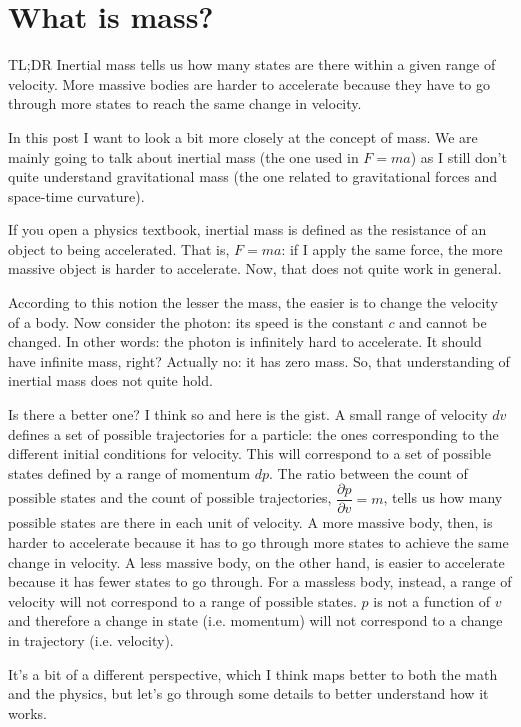 \documentclass[aps,pra,10pt,floatfix,nofootinbib]{revtex4-1}
\theoremstyle{definition}
\begin{document}
	
\section{What is mass?}

TL;DR Inertial mass tells us how many states are there within a given range of velocity. More massive bodies are harder to accelerate because they have to go through more states to reach the same change in velocity.

In this post I want to look a bit more closely at the concept of mass. We are mainly going to talk about inertial mass (the one used in $F=ma$) as I still don't quite understand gravitational mass (the one related to gravitational forces and space-time curvature).

If you open a physics textbook, inertial mass is defined as the resistance of an object to being accelerated. That is, $F=ma$: if I apply the same force, the more massive object is harder to accelerate. Now, that does not quite work in general.

According to this notion the lesser the mass, the easier is to change the velocity of a body. Now consider the photon: its speed is the constant $c$ and cannot be changed. In other words: the photon is infinitely hard to accelerate. It should have infinite mass, right? Actually no: it has zero mass. So, that understanding of inertial mass does not quite hold.

Is there a better one? I think so and here is the gist. A small range of velocity $dv$ defines a set of possible trajectories for a particle: the ones corresponding to the different initial conditions for velocity. This will correspond to a set of possible states defined by a range of momentum $dp$. The ratio between the count of possible states and the count of possible trajectories, $\dfrac{\partial p}{\partial v} = m$, tells us how many possible states are there in each unit of velocity. A more massive body, then, is harder to accelerate because it has to go through more states to achieve the same change in velocity. A less massive body, on the other hand, is easier to accelerate because it has fewer states to go through. For a massless body, instead, a range of velocity will not correspond to a range of possible states. $p$ is not a function of $v$ and therefore a change in state (i.e. momentum) will not correspond to a change in trajectory (i.e. velocity).

It's a bit of a different perspective, which I think maps better to both the math and the physics, but let's go through some details to better understand how it works.
\end{document}
